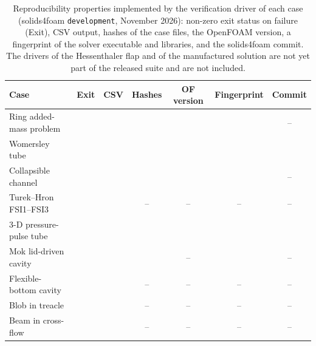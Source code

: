 \begin{table}[htbp]
	\centering
	\footnotesize
	\setlength{\tabcolsep}{4pt}
	\caption{Reproducibility properties implemented by the verification driver of each case (solids4foam \texttt{development}, November 2026): non-zero exit status on failure (Exit), CSV output, hashes of the case files, the OpenFOAM version, a fingerprint of the solver executable and libraries, and the solids4foam commit. The drivers of the Hessenthaler flap and of the manufactured solution are not yet part of the released suite and are not included.}
	\label{tab:driver_properties}
	\begin{tabular}{lcccccc}
		\toprule
		Case & Exit & CSV & Hashes & OF version & Fingerprint & Commit \\
		\midrule
		Ring added-mass problem & \checkmark & \checkmark & \checkmark & \checkmark & \checkmark & -- \\
		Womersley tube & \checkmark & \checkmark & \checkmark & \checkmark & \checkmark & \checkmark \\
		Collapsible channel & \checkmark & \checkmark & \checkmark & \checkmark & \checkmark & -- \\
		Turek--Hron FSI1--FSI3 & \checkmark & \checkmark & -- & -- & -- & -- \\
		3-D pressure-pulse tube & \checkmark & \checkmark & \checkmark & \checkmark & \checkmark & \checkmark \\
		Mok lid-driven cavity & \checkmark & \checkmark & \checkmark & -- & \checkmark & -- \\
		Flexible-bottom cavity & \checkmark & \checkmark & -- & -- & -- & -- \\
		Blob in treacle & \checkmark & \checkmark & -- & -- & -- & -- \\
		Beam in cross-flow & \checkmark & \checkmark & -- & -- & -- & -- \\
		\bottomrule
	\end{tabular}
\end{table}
